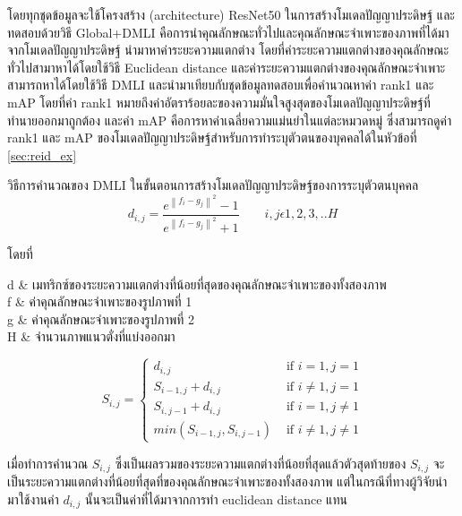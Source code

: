 โดยทุกชุดข้อมูลจะใช้โครงสร้าง (architecture) ResNet50 ในการสร้างโมเดลปัญญาประดิษฐ์ และทดสอบด้วยวิธี Global+DMLI คือการนำคุณลักษณะทั่วไปและคุณลักษณะจำเพาะของภาพที่ได้มาจากโมเดลปัญญาประดิษฐ์ นำมาหาค่าระยะความแตกต่าง โดยที่ค่าระยะความแตกต่างของคุณลักษณะทั่วไปสามาหาได้โดยใช้วิธี Euclidean distance และค่าระยะความแตกต่างของคุณลักษณะจำเพาะสามารถหาได้โดยใช้วิธี DMLI และนำมาเทียบกับชุดข้อมูลทดสอบเพื่อคำนวณหาค่า rank1 และ mAP โดยที่ค่า rank1 หมายถึงค่าอัตราร้อยละของความมั่นใจสูงสุดของโมเดลปัญญาประดิษฐ์ที่ทำนายออกมาถูกต้อง 
และค่า mAP คือการหาค่าเฉลี่ยความแม่นยำในแต่ละหมวดหมู่ ซึ่งสามารถดูค่า rank1 และ mAP ของโมเดลปัญญาประดิษฐ์สำหรับการทำระบุตัวตนของบุคคลได้ในหัวข้อที่ \ref{sec:reid_ex}

วิธีการคำนวณของ DMLI ในขั้นตอนการสร้างโมเดลปัญญาประดิษฐ์ของการระบุตัวตนบุคคล
\begin{equation}
d_{i,j} = \frac{e^{\left \| f_{i} - g_{j} \right \|^{2}} - 1}{e^{\left \| f_{i} - g_{j} \right \|^{2}} + 1} \qquad i,j \epsilon 1,2,3,..H
\end{equation}

โดยที่
\begin{conditions}
d		&		เมทริกซ์ของระยะความแตกต่างที่น้อยที่สุดของคุณลักษณะจำเพาะของทั้งสองภาพ			\\
f		&		ค่าคุณลักษณะจำเพาะของรูปภาพที่ 1				\\
g		&		ค่าคุณลักษณะจำเพาะของรูปภาพที่ 2				\\
H		&		จำนวนภาพแนวตั่งที่แบ่งออกมา
\end{conditions}

\begin{equation}
S_{i,j} = \begin{cases}
d_{i,j} & \text{ if } i=1,j=1 \\ 
S_{i-1,j}+d_{i,j} & \text{ if } i\neq 1,j=1 \\ 
S_{i,j-1}+d_{i,j} & \text{ if } i=1,j\neq1 \\ 
min(S_{i-1,j},S_{i,j-1}) & \text{ if } i\neq1,j\neq1 
\end{cases}
\end{equation}

เมื่อทำการคำนวณ $S_{i,j}$ ซึ่งเป็นผลรวมของระยะความแตกต่างที่น้อยที่สุดแล้วตัวสุดท้ายของ $S_{i,j}$ จะเป็นระยะความแตกต่างที่น้อยที่สุดที่ของคุณลักษณะจำเพาะของทั้งสองภาพ แต่ในกรณีที่ทางผู้วิจัยนำมาใช้งานค่า $d_{i,j}$ นั้นจะเป็นค่าที่ได้มาจากการทำ euclidean distance แทน
